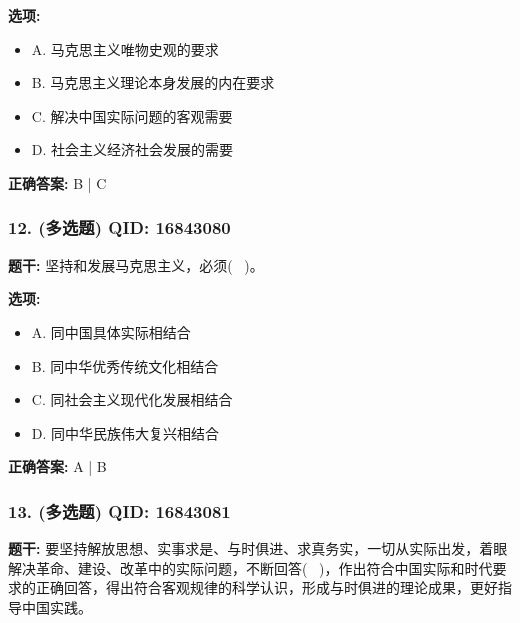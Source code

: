 \documentclass[12pt,UTF8]{ctexart}
\begin{document}
\textbf{选项:}
\begin{itemize}[leftmargin=*]

  \item A. 马克思主义唯物史观的要求

  \item B. 马克思主义理论本身发展的内在要求

  \item C. 解决中国实际问题的客观需要

  \item D. 社会主义经济社会发展的需要

\end{itemize}

\textbf{正确答案:}
B | C

\vspace{0.3em}\hrulefill\vspace{0.7em}

\subsubsection*{12. (多选题) \small QID: 16843080}

\textbf{题干:}
坚持和发展马克思主义，必须(  )。

\textbf{选项:}
\begin{itemize}[leftmargin=*]

  \item A. 同中国具体实际相结合

  \item B. 同中华优秀传统文化相结合

  \item C. 同社会主义现代化发展相结合

  \item D. 同中华民族伟大复兴相结合

\end{itemize}

\textbf{正确答案:}
A | B

\vspace{0.3em}\hrulefill\vspace{0.7em}

\subsubsection*{13. (多选题) \small QID: 16843081}

\textbf{题干:}
要坚持解放思想、实事求是、与时俱进、求真务实，一切从实际出发，着眼解决革命、建设、改革中的实际问题，不断回答(  )，作出符合中国实际和时代要求的正确回答，得出符合客观规律的科学认识，形成与时俱进的理论成果，更好指导中国实践。
\end{document}
